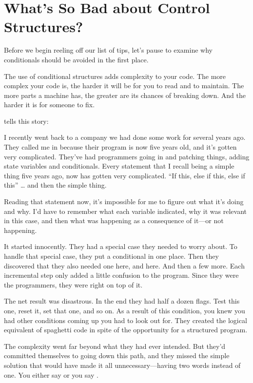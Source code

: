 \section{What's So Bad about Control Structures?}%

Before we begin reeling off our list of tips, let's pause to examine why
conditionals should be avoided in the first place.

The use of conditional structures adds complexity to your code. The
more complex your code is, the harder it will be for you to read and to
maintain. The more parts a machine has, the greater are its chances of
breaking down. And the harder it is for someone to fix.

\begin{interview}
 tells this story:
\begin{tfquot}
I recently went back to a company we had done some work for several years
ago. They called me in because their program is now five years old, and
it's gotten very complicated. They've had programmers going in and
patching things, adding state variables and conditionals. Every statement
that I recall being a simple thing five years ago, now has gotten very
complicated.  ``If this, else if this, else if this'' \dots{} and then the
simple thing.

Reading that statement now, it's impossible for me to figure out what it's
doing and why. I'd have to remember what each variable indicated, why it
was relevant in this case, and then what was happening as a consequence of
it---or not happening.

It started innocently. They had a special case they needed to worry about.
To handle that special case, they put a conditional in one place. Then they
discovered that they also needed one here, and here. And then a few more.
Each incremental step only added a little confusion to the program. Since
they were the programmers, they were right on top of it.

The net result was disastrous. In the end they had half a dozen flags.
Test this one, reset it, set that one, and so on. As a result of this
condition, you knew you had other conditions coming up you had to look out
for. They created the logical equivalent of spaghetti code in spite of the
opportunity for a structured program.

The complexity went far beyond what they had ever intended. But they'd
committed themselves to going down this path, and they missed the simple
solution that would have made it all unnecessary---having two words
instead of one. You either say  or you say .


\end{tfquot}
\end{interview}
